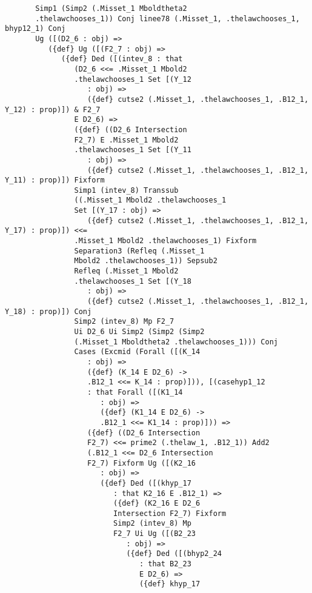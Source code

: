 \documentclass[12pt]{article}
\begin{document}
\begin{verbatim}
       Simp1 (Simp2 (.Misset_1 Mboldtheta2 
       .thelawchooses_1)) Conj linee78 (.Misset_1, .thelawchooses_1, bhyp12_1) Conj 
       Ug ([(D2_6 : obj) => 
          ({def} Ug ([(F2_7 : obj) => 
             ({def} Ded ([(intev_8 : that 
                (D2_6 <<= .Misset_1 Mbold2 
                .thelawchooses_1 Set [(Y_12 
                   : obj) => 
                   ({def} cutse2 (.Misset_1, .thelawchooses_1, .B12_1, Y_12) : prop)]) & F2_7 
                E D2_6) => 
                ({def} ((D2_6 Intersection 
                F2_7) E .Misset_1 Mbold2 
                .thelawchooses_1 Set [(Y_11 
                   : obj) => 
                   ({def} cutse2 (.Misset_1, .thelawchooses_1, .B12_1, Y_11) : prop)]) Fixform 
                Simp1 (intev_8) Transsub 
                ((.Misset_1 Mbold2 .thelawchooses_1 
                Set [(Y_17 : obj) => 
                   ({def} cutse2 (.Misset_1, .thelawchooses_1, .B12_1, Y_17) : prop)]) <<= 
                .Misset_1 Mbold2 .thelawchooses_1) Fixform 
                Separation3 (Refleq (.Misset_1 
                Mbold2 .thelawchooses_1)) Sepsub2 
                Refleq (.Misset_1 Mbold2 
                .thelawchooses_1 Set [(Y_18 
                   : obj) => 
                   ({def} cutse2 (.Misset_1, .thelawchooses_1, .B12_1, Y_18) : prop)]) Conj 
                Simp2 (intev_8) Mp F2_7 
                Ui D2_6 Ui Simp2 (Simp2 (Simp2 
                (.Misset_1 Mboldtheta2 .thelawchooses_1))) Conj 
                Cases (Excmid (Forall ([(K_14 
                   : obj) => 
                   ({def} (K_14 E D2_6) -> 
                   .B12_1 <<= K_14 : prop)])), [(casehyp1_12 
                   : that Forall ([(K1_14 
                      : obj) => 
                      ({def} (K1_14 E D2_6) -> 
                      .B12_1 <<= K1_14 : prop)])) => 
                   ({def} ((D2_6 Intersection 
                   F2_7) <<= prime2 (.thelaw_1, .B12_1)) Add2 
                   (.B12_1 <<= D2_6 Intersection 
                   F2_7) Fixform Ug ([(K2_16 
                      : obj) => 
                      ({def} Ded ([(khyp_17 
                         : that K2_16 E .B12_1) => 
                         ({def} (K2_16 E D2_6 
                         Intersection F2_7) Fixform 
                         Simp2 (intev_8) Mp 
                         F2_7 Ui Ug ([(B2_23 
                            : obj) => 
                            ({def} Ded ([(bhyp2_24 
                               : that B2_23 
                               E D2_6) => 
                               ({def} khyp_17 

\end{verbatim}
\end{document}

